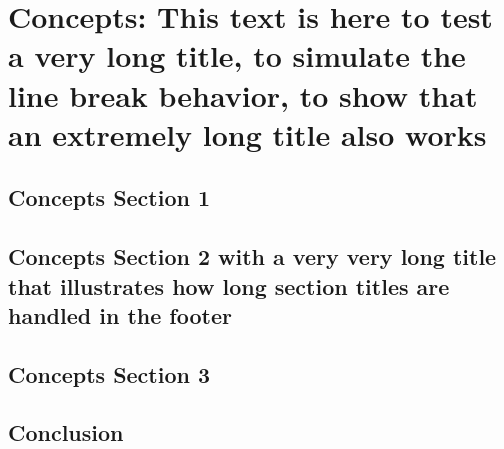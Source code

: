 %
\chapter{Concepts: This text is here to test a very long title, to simulate the line break behavior, to show that an extremely long title also works}
\label{sec:concepts}


\Blindtext[2][1]

\section{Concepts Section 1}
\label{sec:concepts:sec1}

\Blindtext[2][2]

\section{Concepts Section 2 with a very very long title that illustrates how long section titles are handled in the footer}
\label{sec:concepts:sec2}

\Blindtext[3][2]

\section{Concepts Section 3}
\label{sec:concepts:sec3}

\Blindtext[4][2]

\section{Conclusion}
\label{sec:concepts:conclusion}

\Blindtext[2][1]
